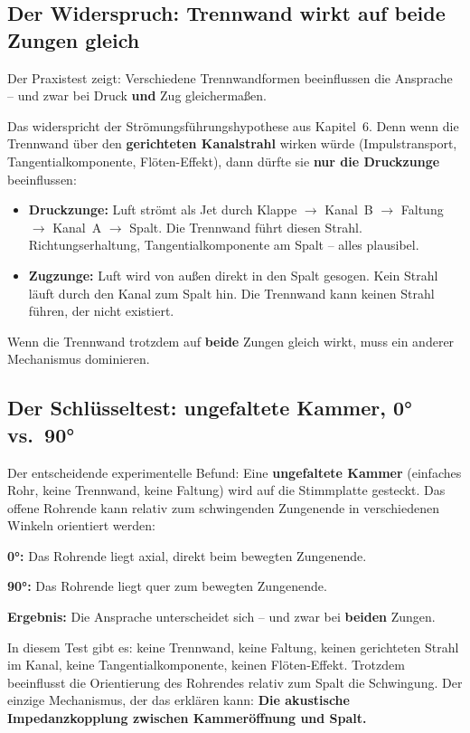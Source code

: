 \documentclass[11pt,a4paper]{article}
\begin{document}
\subsection{Der Widerspruch: Trennwand wirkt auf beide Zungen gleich}

Der Praxistest zeigt: Verschiedene Trennwandformen beeinflussen die Ansprache -- und zwar bei Druck \textbf{und} Zug gleichermaßen.

Das widerspricht der Strömungs\-führungs\-hypothese aus Kapitel~6. Denn wenn die Trennwand über den \textbf{gerichteten Kanalstrahl} wirken würde (Impulstransport, Tangentialkomponente, Flöten-Effekt), dann dürfte sie \textbf{nur die Druckzunge} beeinflussen:

\begin{itemize}[leftmargin=5mm, itemsep=1pt]
\item \textbf{Druckzunge:} Luft strömt als Jet durch Klappe $\to$ Kanal~B $\to$ Faltung $\to$ Kanal~A $\to$ Spalt. Die Trennwand führt diesen Strahl. Richtungserhaltung, Tangentialkomponente am Spalt -- alles plausibel.
\item \textbf{Zugzunge:} Luft wird von außen direkt in den Spalt gesogen. Kein Strahl läuft durch den Kanal zum Spalt hin. Die Trennwand kann keinen Strahl führen, der nicht existiert.
\end{itemize}

Wenn die Trennwand trotzdem auf \textbf{beide} Zungen gleich wirkt, muss ein anderer Mechanismus dominieren.

\subsection{Der Schlüsseltest: ungefaltete Kammer, 0° vs.\ 90°}

Der entscheidende experimentelle Befund: Eine \textbf{ungefaltete Kammer} (einfaches Rohr, keine Trennwand, keine Faltung) wird auf die Stimmplatte gesteckt. Das offene Rohrende kann relativ zum schwingenden Zungenende in verschiedenen Winkeln orientiert werden:

\textbf{0°:} Das Rohrende liegt axial, direkt beim bewegten Zungenende.

\textbf{90°:} Das Rohrende liegt quer zum bewegten Zungenende.

\textbf{Ergebnis:} Die Ansprache unterscheidet sich -- und zwar bei \textbf{beiden} Zungen.

In diesem Test gibt es: keine Trennwand, keine Faltung, keinen gerichteten Strahl im Kanal, keine Tangentialkomponente, keinen Flöten-Effekt. Trotzdem beeinflusst die Orientierung des Rohrendes relativ zum Spalt die Schwingung. Der einzige Mechanismus, der das erklären kann: \textbf{Die akustische Impedanzkopplung zwischen Kammeröffnung und Spalt.}
\end{document}
